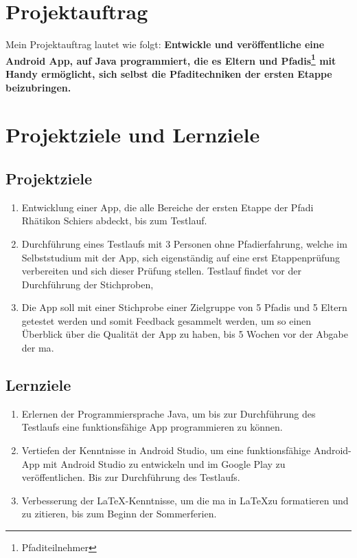 \documentclass{report}
\begin{document}
\section{Projektauftrag}
Mein Projektauftrag lautet wie folgt: \textbf{Entwickle und veröffentliche eine Android App, auf Java programmiert, die es Eltern und Pfadis\footnote{Pfaditeilnehmer} mit Handy ermöglicht, sich selbst die Pfaditechniken der ersten Etappe beizubringen.}

\section{Projektziele und Lernziele}
\subsection*{Projektziele}
\begin{enumerate}
    \item Entwicklung einer App, die alle Bereiche der ersten Etappe der Pfadi Rhätikon Schiers abdeckt, bis zum Testlauf.
    \item Durchführung eines Testlaufs mit 3 Personen ohne Pfadierfahrung, welche im Selbststudium mit der App, sich eigenständig auf eine erst Etappenprüfung verbereiten und sich dieser Prüfung stellen. Testlauf findet vor der Durchführung der Stichproben,
    \item Die App soll mit einer Stichprobe einer Zielgruppe von 5 Pfadis und 5 Eltern getestet werden und somit Feedback gesammelt werden, um so einen Überblick über die Qualität der App zu haben, bis 5 Wochen vor der Abgabe der \gls{ma}.
\end{enumerate}
\subsection*{Lernziele}
\begin{enumerate}
    \item Erlernen der Programmiersprache Java, um bis zur Durchführung des Testlaufs eine funktionsfähige App programmieren zu können.
    \item Vertiefen der Kenntnisse in Android Studio, um eine funktionsfähige Android-App mit Android Studio zu entwickeln und im Google Play zu veröffentlichen. Bis zur Durchführung des Testlaufs.
    \item Verbesserung der LaTeX-Kenntnisse, um die \gls{ma} in \LaTeX zu formatieren und zu zitieren, bis zum Beginn der Sommerferien.
\end{enumerate}
\end{document}
